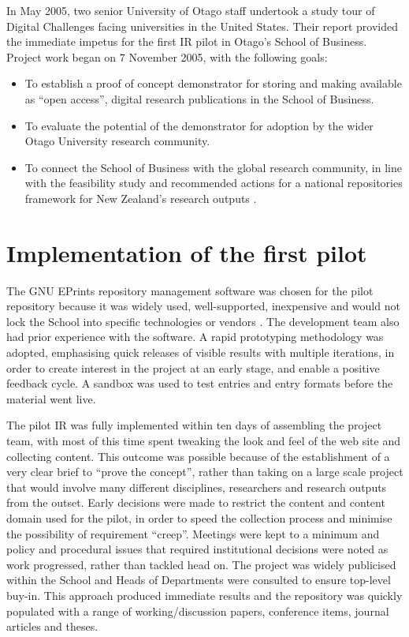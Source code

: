 \documentclass[12pt,pdftex,a4paper,titlepage]{article}
\begin{document}
In May 2005, two senior University of Otago staff undertook a study tour of Digital Challenges facing universities in the United States. Their report provided the immediate impetus for the first IR pilot in Otago's School of Business. Project work began on 7 November 2005, with the following goals:
 
\begin{itemize}

	\item To establish a proof of concept demonstrator for storing and making available as ``open access'', digital research publications in the School of Business.

	\item To evaluate the potential of the demonstrator for adoption by the wider Otago University research community.

	\item To connect the School of Business with the global research community, in line with the feasibility study and recommended actions for a national repositories framework for New Zealand's research outputs \cite{Rank-J-2005-feasibility}.

\end{itemize}


\section{Implementation of the first pilot}

The GNU EPrints repository management software was chosen for the pilot repository because it was widely used, well-supported, inexpensive and would not lock the School into specific technologies or vendors \cite{Sale-A-2005-NZIRW}. The development team also had prior experience with the software. A rapid prototyping methodology was adopted, emphasising quick releases of visible results with multiple iterations, in order to create interest in the project at an early stage, and enable a positive feedback cycle. A sandbox was used to test entries and entry formats before the material went live.

The pilot IR was fully implemented within ten days of assembling the project team, with most of this time spent tweaking the look and feel of the web site and collecting content. This outcome was possible because of the establishment of a very clear brief to ``prove the concept'', rather than taking on a large scale project that would involve many different disciplines, researchers and research outputs from the outset. Early decisions were made to restrict the content and content domain used for the pilot, in order to speed the collection process and minimise the possibility of requirement ``creep''. Meetings were kept to a minimum and policy and procedural issues that required institutional decisions were noted as work progressed, rather than tackled head on. The project was widely publicised within the School and Heads of Departments were consulted to ensure top-level buy-in. This approach produced immediate results and the repository was quickly populated with a range of working/discussion papers, conference items, journal articles and theses.
\end{document}
